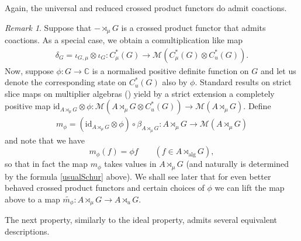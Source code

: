 \documentclass[12pt]{amsart}
\theoremstyle{definition}
\theoremstyle{remark}
\newtheorem{rem}[thm]{Remark}
\numberwithin{equation}{section}
\newcommand{\C}{\mathbb{C}}
\begin{document}
	Again, the universal and reduced crossed product functors do admit
    coactions.


\begin{rem}\label{rem:comultiplication}
	Suppose that $-\rtimes_\mu G$ is a crossed product functor that admits coactions. As a special
	case, we obtain a comultiplication like map
	\begin{align*}
		\delta_G = \iota_{G,\mu}\otimes \iota_{G}\colon C_\mu^*(G) \to \mathcal{M}(C^*_\mu (G)
		\otimes C^*_u(G)).
	\end{align*}
	Now, suppose $\phi\colon G \to \C$ is a normalised positive definite function on $G$ and
	let us  denote the corresponding state on $C^*_u(G)$ also by $\phi$. %
Standard results on strict slice maps on multiplier algebras (\cite{Lance}) yield by a strict extension a completely positive map	$\mathrm{id}_{A\rtimes_\mu G }\otimes \phi \colon \mathcal{M}	(A\rtimes_\mu G  \otimes C^*_u(G)) \to
	\mathcal{M}(A\rtimes_\mu G )$. Define
	\begin{align*}
		m_\phi = (\mathrm{id}_{A\rtimes_\mu G }\otimes \phi) \circ \beta_{A\rtimes_\mu G } \colon A\rtimes_\mu G
		\to \mathcal{M}(A\rtimes_\mu G )
	\end{align*}
	and note that we have
	\begin{equation}\label{usualSchur}
		m_\phi( f) = \phi f\qquad(f \in 	A\rtimes_{\mathrm{alg}}G),
	\end{equation}
so that in fact the map $m_\phi$ takes values in $A\rtimes_\mu G $ (and naturally is determined by the formula \eqref{usualSchur} above). We shall see later that for even better behaved crossed product functors and certain choices of $\phi$ we can lift the map above to a map $\widetilde{m_\phi}\colon A\rtimes_\mu G
		\to A\rtimes_u G $.
\end{rem}

The next property, similarly to the ideal property, admits several equivalent descriptions.
\end{document}
